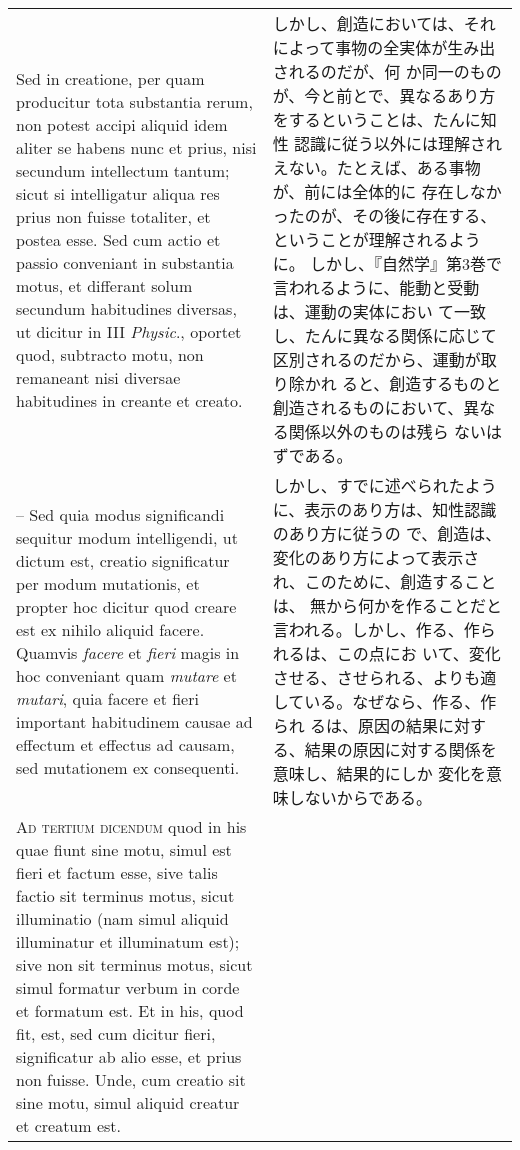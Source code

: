 \documentclass[10pt]{jsarticle} %
\begin{document}
\begin{longtable}{p{21em}p{21em}}
\\

 Sed in creatione, per quam producitur tota substantia rerum,
 non potest accipi aliquid idem aliter se habens nunc et prius, nisi
 secundum intellectum tantum; sicut si intelligatur aliqua res prius non
 fuisse totaliter, et postea esse. Sed cum actio et passio conveniant in
 substantia motus, et differant solum secundum habitudines diversas, ut
 dicitur in III {\itshape Physic}., oportet quod, subtracto motu, non remaneant
 nisi diversae habitudines in creante et creato. 

&

しかし、創造においては、それによって事物の全実体が生み出されるのだが、何
 か同一のものが、今と前とで、異なるあり方をするということは、たんに知性
 認識に従う以外には理解されえない。たとえば、ある事物が、前には全体的に
 存在しなかったのが、その後に存在する、ということが理解されるように。
しかし、『自然学』第3巻で言われるように、能動と受動は、運動の実体におい
 て一致し、たんに異なる関係に応じて区別されるのだから、運動が取り除かれ
 ると、創造するものと創造されるものにおいて、異なる関係以外のものは残ら
 ないはずである。

\\

-- Sed quia modus significandi sequitur modum intelligendi, ut dictum
 est, creatio significatur per modum mutationis, et propter hoc dicitur
 quod creare est ex nihilo aliquid facere. Quamvis {\itshape facere} et
 {\itshape fieri} magis in hoc conveniant quam {\itshape mutare} et
 {\itshape mutari}, quia facere et fieri important habitudinem causae ad
 effectum et effectus ad causam, sed mutationem ex consequenti.

&

しかし、すでに述べられたように、表示のあり方は、知性認識のあり方に従うの
 で、創造は、変化のあり方によって表示され、このために、創造することは、
 無から何かを作ることだと言われる。しかし、作る、作られるは、この点にお
 いて、変化させる、させられる、よりも適している。なぜなら、作る、作られ
 るは、原因の結果に対する、結果の原因に対する関係を意味し、結果的にしか
 変化を意味しないからである。


\\

{\scshape Ad tertium dicendum} quod in his quae fiunt sine motu, simul est fieri et
 factum esse, sive talis factio sit terminus motus, sicut illuminatio
 (nam simul aliquid illuminatur et illuminatum est); sive non sit
 terminus motus, sicut simul formatur verbum in corde et formatum
 est. Et in his, quod fit, est, sed cum dicitur fieri, significatur ab
 alio esse, et prius non fuisse. Unde, cum creatio sit sine motu, simul
 aliquid creatur et creatum est.


\end{longtable}
\end{document}
